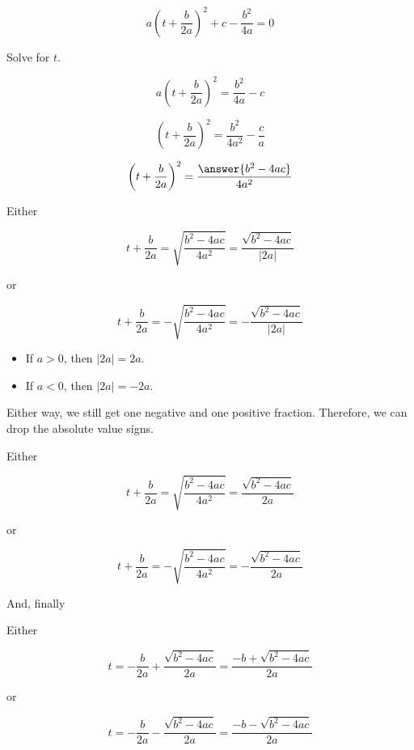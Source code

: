 \documentclass{ximera}
\begin{document}
\[ a\left(t + \frac{b}{2 a}\right)^2 + c - \frac{b^2}{4 a}  = 0\]

Solve for $t$.



\begin{explanation}
\[ a \left(t + \frac{b}{2 a} \right)^2  = \frac{b^2}{4 a} - c\]

\[ \left(t + \frac{b}{2 a} \right)^2  = \frac{b^2}{4 a^2} - \frac{c}{a}\]

\[ \left(t + \frac{b}{2 a} \right)^2  = \frac{\answer{b^2 - 4 a c}}{4 a^2} \]
\end{explanation}


Either 


\[ t + \frac{b}{2 a}  = \sqrt{\frac{b^2 - 4 a c}{4 a^2}}  = \frac{\sqrt{b^2 - 4 a c}}{| 2a |}   \]

or


\[ t + \frac{b}{2 a}  = -\sqrt{\frac{b^2 - 4 a c}{4 a^2}} = -\frac{\sqrt{b^2 - 4 a c}}{| 2a |}    \]



\begin{itemize}
\item If $a > 0$, then $| 2a | = 2a$.
\item If $a < 0$, then $| 2a | = -2a$.
\end{itemize}

Either way, we still get one negative and one positive fraction.  Therefore, we can drop the absolute value signs.  





Either 


\[ t + \frac{b}{2 a}  = \sqrt{\frac{b^2 - 4 a c}{4 a^2}}  = \frac{\sqrt{b^2 - 4 a c}}{2a}   \]

or


\[ t + \frac{b}{2 a}  = -\sqrt{\frac{b^2 - 4 a c}{4 a^2}} = -\frac{\sqrt{b^2 - 4 a c}}{2a}    \]










And, finally \\


\begin{conclusion}



Either 


\[ t   = - \frac{b}{2 a} + \frac{\sqrt{b^2 - 4 a c}}{2a}  = \frac{-b + \sqrt{b^2 - 4 a c}}{2a}      \]

or


\[ t  = - \frac{b}{2 a}  -\frac{\sqrt{b^2 - 4 a c}}{2a} =    \frac{-b - \sqrt{b^2 - 4 a c}}{2a}      \]

\end{conclusion}
\end{document}
